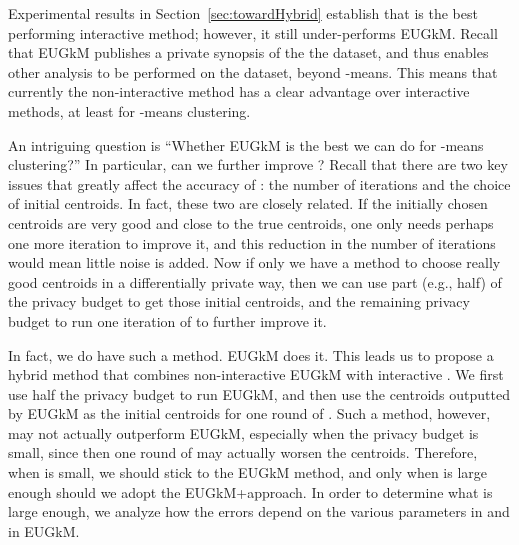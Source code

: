 
Experimental results in Section~\ref{sec:towardHybrid} establish that \dpl is the best performing interactive method; however, it still under-performs EUGkM.  Recall that EUGkM publishes a private synopsis of the the dataset, and thus enables other analysis to be performed on the dataset, beyond -means.  This means that currently the non-interactive method has a clear advantage over interactive methods, at least for -means clustering.  

An intriguing question is ``Whether EUGkM is the best we can do for -means clustering?'' In particular, can we further improve \dpl?  Recall that there are two key issues that greatly affect the accuracy of \dpl: the number of iterations and the choice of initial centroids.  In fact, these two are closely related.  If the initially chosen centroids are very good and close to the true centroids, one only needs perhaps one more iteration to improve it, and this reduction in the number of iterations would mean little noise is added.  Now if only we have a method to choose really good centroids in a differentially private way, then we can use part (e.g., half) of the privacy budget to get those initial centroids, and the remaining privacy budget to run one iteration of \dpl to further improve it.  

In fact, we do have such a method.  EUGkM does it.  This leads us to propose a hybrid method that combines non-interactive EUGkM with interactive \dpl.  We first use half the privacy budget to run EUGkM, and then use the centroids outputted by EUGkM as the initial centroids for one round of \dpl.  Such a method, however, may not actually outperform EUGkM, especially when the privacy budget  is small, since then one round of \dpl may actually worsen the centroids.  Therefore, when  is small, we should stick to the EUGkM method, and only when  is large enough should we adopt the EUGkM+\dpl approach.  In order to determine what  is large enough, we analyze how the errors depend on the various parameters in \dpl and in EUGkM.



